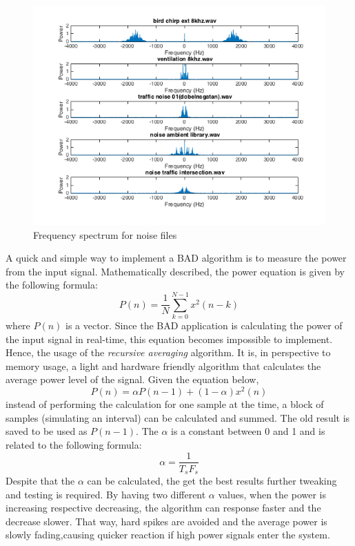 \begin{figure}
  \centering
  \includegraphics[width=1\textwidth]{sections/freq_spec_noise_2.png}
  \caption{Frequency spectrum for noise files}
  \label{fig:noise_spec}
\end{figure}

A quick and simple way to implement a BAD algorithm is to measure the power from the input signal.
Mathematically described, the power equation is given by the following formula: 
\[
P(n) = \frac{1}{N} \sum\limits_{k=0}^{N-1} x^2(n-k)
\]
where $P(n)$ is a vector. Since the BAD application is calculating the power of the input signal in 
real-time, this equation becomes impossible to implement. Hence, the usage of the \emph{recursive
averaging} algorithm. It is, in perspective to memory usage, a light and hardware friendly algorithm 
that calculates the average power level of the signal. Given the equation below,
\[
P(n) = \alpha P(n-1)+(1-\alpha)x^2(n)
\]
instead of performing the calculation for one sample at the time, a block of samples (simulating an interval) can be calculated and summed.
The old result is saved to be used as $P(n-1)$. The $\alpha$ is a constant between 0 and 1 and is related to the 
following formula:
\[
\alpha = \frac{1}{T_{s}F_{s}}
\]
Despite that the $\alpha$ can be calculated, the get the best results further tweaking and testing is required.
By having two different $\alpha$ values, when the power is increasing respective decreasing, the algorithm
can response faster and the decrease slower. That way, hard spikes are avoided and the average power is slowly
fading,causing quicker reaction if high power signals enter the system.

